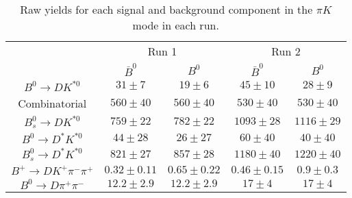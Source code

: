 \begin{table}
  \centering
  \begin{tabular}{ccccc}
      \toprule
       & \multicolumn{2}{c}{Run 1} & \multicolumn{2}{c}{Run 2} \\
      & $\bar{B}^0$ & $B^0$& $\bar{B}^0$ & $B^0$ \\
      \midrule
      $B^0 \to DK^{*0}$ & $31 \pm 7$ & $19 \pm 6$ & $45 \pm 10$ & $28 \pm 9$ \\
      Combinatorial & $560 \pm 40$ & $560 \pm 40$ & $530 \pm 40$ & $530 \pm 40$ \\
      $B^0_s \to DK^{*0}$ & $759 \pm 22$ & $782 \pm 22$ & $1093 \pm 28$ & $1116 \pm 29$ \\
      $B^0 \to D^*K^{*0}$ & $44 \pm 28$ & $26 \pm 27$ & $60 \pm 40$ & $40 \pm 40$ \\
      $B^0_s \to D^*K^{*0}$ & $821 \pm 27$ & $857 \pm 28$ & $1180 \pm 40$ & $1220 \pm 40$ \\
      $B^+ \to DK^+\pi^-\pi^+$ & $0.32 \pm 0.11$ & $0.65 \pm 0.22$ & $0.46 \pm 0.15$ & $0.9 \pm 0.3$ \\
      $B^0 \to D\pi^+\pi^-$ & $12.2 \pm 2.9$ & $12.2 \pm 2.9$ & $17 \pm 4$ & $17 \pm 4$ \\
      \bottomrule
      \end{tabular}
\caption{Raw yields for each signal and background component in the $\pi K$ mode in each run.}
\label{tab:yields_piK}
\end{table}

